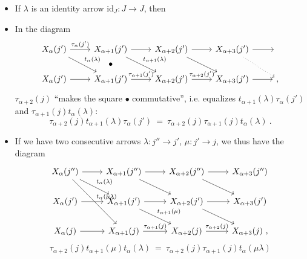 \begin{itemize}[leftmargin=3em]
\item[(i)] If $\lambda$ is an identity arrow $\mathrm{id}_J : J\longrightarrow J$, then  %
\item[(ii)] In the diagram
\[
\begin{tikzcd}
X_\alpha(j') \arrow[r,"\tau_\alpha(j')"] \arrow[dr,"t_\alpha(\lambda)"] & X_{\alpha+1}(j') \arrow[r] \arrow[dr,"t_{\alpha+1}(\lambda)"] \arrow[d,phantom,"\bullet"] & X_{\alpha+2}(j') \arrow[r] \arrow[dr] & X_{\alpha+3}(j') \arrow[r] \arrow[dr,dotted] & {} \\
X_\alpha(j') \arrow[r] & X_{\alpha+1}(j') \arrow[r,"\tau_{\alpha+1}(j')"] & X_{\alpha+2}(j') \arrow[r,"\tau_{\alpha+2}(j')"] & X_{\alpha+3}(j') \arrow[r] & {,}
\end{tikzcd}
\] %
$\tau_{\alpha+2}(j)$ ``makes the square $\bullet$ commutative'', i.e. equalizes $t_{\alpha+1}(\lambda)\tau_\alpha(j')$ and $\tau_{\alpha+1}(j)t_\alpha(\lambda)$:
\[
\boxed{\tau_{\alpha+2}(j)t_{\alpha+1}(\lambda)\tau_\alpha(j')\ =\ \tau_{\alpha+2}(j)\tau_{\alpha+1}(j)t_\alpha(\lambda)\ .}
\]
\item[(iii)] If we have two consecutive arrows $\lambda : j''\longrightarrow j'$, $\mu : j'\longrightarrow j$, we thus have the diagram
\[
\begin{tikzcd}
X_\alpha(j'') \arrow[r] \arrow[dr,"t_\alpha(\lambda)"] \arrow[ddr,"t_\alpha(\mu\lambda)"] & X_{\alpha+1}(j'') \arrow[r] \arrow[dr] & X_{\alpha+2}(j'') \arrow[r] \arrow[dr] & X_{\alpha+3}(j'') \\
X_\alpha(j') \arrow[r] & X_{\alpha+1}(j') \arrow[r] \arrow[dr,"t_{\alpha+1}(\mu)"] & X_{\alpha+2}(j') \arrow[r] \arrow[dr] & X_{\alpha+3}(j') \\
X_\alpha(j) \arrow[r] & X_{\alpha+1}(j) \arrow[r,"\tau_{\alpha+1}(j)"] & X_{\alpha+2}(j) \arrow[r,"\tau_{\alpha+2}(j)"] & X_{\alpha+3}(j)\ ,
\end{tikzcd}
\]
\[
\boxed{\tau_{\alpha+2}(j)t_{\alpha+1}(\mu)t_\alpha(\lambda)\ =\ \tau_{\alpha+2}(j)\tau_{\alpha+1}(j)t_\alpha(\mu\lambda)}
\]
\end{itemize}

